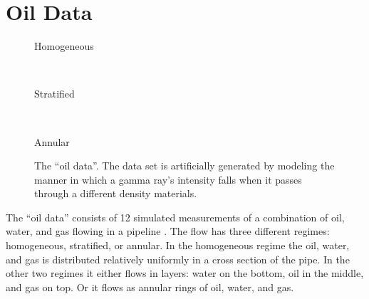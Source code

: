 \section{Oil Data}
\begin{figure}
  \begin{center}
    \begin{minipage}[b][0.5\textheight][t]{0.5\columnwidth}%
      \begin{minipage}[t][0.2\textheight]{1\columnwidth}%
        \begin{center}
          Homogeneous
        \end{center}%
      \end{minipage}\\
      \begin{minipage}[t][0.2\textheight]{1\columnwidth}%
        \begin{center}
          Stratified
        \end{center}%
      \end{minipage}\\
      \begin{minipage}[t][0.2\textheight]{1\columnwidth}%
        \begin{center}
          Annular
        \end{center}%
      \end{minipage}%
    \end{minipage}
    
  \end{center}
  \caption{The ``oil data''. The data set is artificially generated by modeling
    the manner in which a gamma ray's intensity falls when it passes through
    a different density materials.}\label{fig:oilData}
  
\end{figure}

The ``oil data'' consists of 12 simulated measurements of a
combination of oil, water, and gas flowing in a pipeline
\cite{Bishop:oil93}. The flow has three different regimes: homogeneous,
stratified, or annular. In the homogeneous regime the oil, water, and
gas is distributed relatively uniformly in a cross section of the
pipe. In the other two regimes it either flows in layers: water on the
bottom, oil in the middle, and gas on top. Or it flows as annular
rings of oil, water, and gas.

